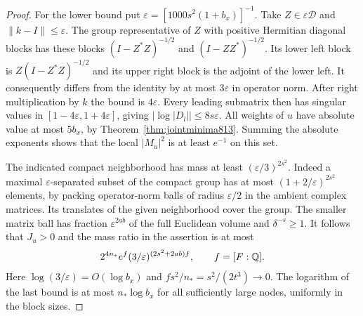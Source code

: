 \documentclass[a4paper,11pt]{article}
\theoremstyle{definition}
\theoremstyle{remark}
\numberwithin{equation}{section}
\begin{document}
\begin{proof}
For the lower bound put \(\varepsilon=[1000s^2(1+b_x)]^{-1}\).
Take \(Z\in\varepsilon\mathcal D\) and \(\|k-I\|\le\varepsilon\).
The group representative of \(Z\) with positive Hermitian
diagonal blocks has these blocks \((I-Z^*Z)^{-1/2}\) and
\((I-ZZ^*)^{-1/2}\). Its lower left block is \(Z(I-Z^*Z)^{-1/2}\)
and its upper right block is the adjoint of the lower left.
It consequently differs from the identity by at most
\(3\varepsilon\) in operator norm. After right multiplication
by \(k\) the bound is \(4\varepsilon\). Every leading
submatrix then has singular values in
\([1-4\varepsilon,1+4\varepsilon]\), giving
\(\big|\log |D_l|\big|\le8s\varepsilon\).
All weights of \(u\) have absolute value at most \(5b_x\),
by Theorem~\ref{thm:jointminima813}. Summing the absolute
exponents shows that the local \(|M_u|^2\) is at least
\(e^{-1}\) on this set.

The indicated compact neighborhood has mass at least
\((\varepsilon/3)^{2s^2}\). Indeed a maximal
\(\varepsilon\)-separated subset of the compact group has
at most \((1+2/\varepsilon)^{2s^2}\) elements, by packing
operator-norm balls of radius \(\varepsilon/2\) in the
ambient complex matrices. Its translates of the given
neighborhood cover the group. The smaller matrix ball
has fraction \(\varepsilon^{2ab}\) of the full Euclidean
volume and \(\delta^{-s}\ge1\). It follows that \(J_u>0\)
and the mass ratio in the assertion is at most
\[
        2^{4n_*}e^f(3/\varepsilon)^{(2s^2+2ab)f},
               \qquad f=[F:\mathbb Q].
\]
Here \(\log(3/\varepsilon)=O(\log b_x)\) and
\(fs^2/n_*=s^2/(2t^3)\to0\). The logarithm of the last
bound is at most \(n_*\log b_x\) for all sufficiently
large nodes, uniformly in the block sizes.
\end{proof}
\end{document}
